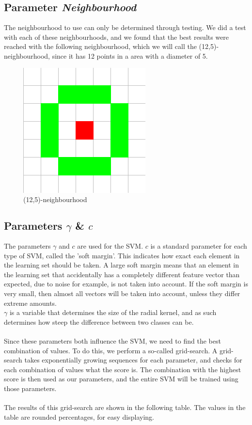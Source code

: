 \documentclass[a4paper]{article}
\begin{document}
\subsection{Parameter \emph{Neighbourhood}}

The neighbourhood to use can only be determined through testing. We did a test
with each of these neighbourhoods, and we found that the best results were
reached with the following neighbourhood, which we will call the
(12,5)-neighbourhood, since it has 12 points in a area with a diameter of 5.

\begin{figure}[H]
\center
\includegraphics[scale=0.5]{12-5neighbourhood.png}
\caption{(12,5)-neighbourhood}
\end{figure}

\subsection{Parameters $\gamma$ \& $c$}

The parameters $\gamma$ and $c$ are used for the SVM. $c$ is a standard
parameter for each type of SVM, called the 'soft margin'. This indicates how
exact each element in the learning set should be taken. A large soft margin
means that an element in the learning set that accidentally has a completely
different feature vector than expected, due to noise for example, is not taken
into account. If the soft margin is very small, then almost all vectors will be
taken into account, unless they differ extreme amounts.\\
$\gamma$ is a variable that determines the size of the radial kernel, and as
such determines how steep the difference between two classes can be.\\
\\
Since these parameters both influence the SVM, we need to find the best
combination of values. To do this, we perform a so-called grid-search. A
grid-search takes exponentially growing sequences for each parameter, and
checks for each combination of values what the score is. The combination with
the highest score is then used as our parameters, and the entire SVM will be
trained using those parameters.\\
\\
The results of this grid-search are shown in the following table. The values
in the table are rounded percentages, for easy displaying.
\end{document}
